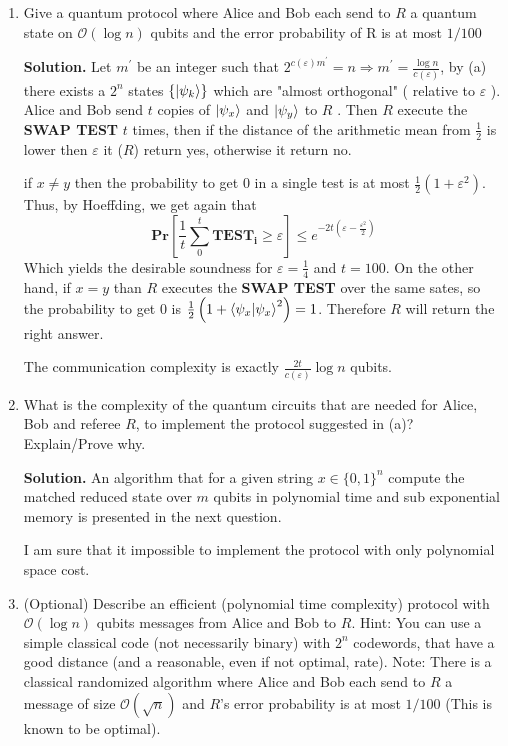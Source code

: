 \documentclass{article}
\newcommand{\onotation}[1]{\(\mathcal{O} \left( {#1}  \right) \)}
\newcommand{\ona}[1]{\onotation{#1}}
\begin{document}
\begin{enumerate}
    \item Give a quantum protocol where Alice and Bob each send to \(R\) a quantum state on \ona{ \log n}  qubits and the error probability of R is at most \( 1/100\) 
    
    
    \textbf{Solution.} Let \(m^\prime\) be an integer such that \( 2^{c(\varepsilon)m^\prime} = n \Rightarrow m^\prime = \frac{\log n}{c(\varepsilon)}\), by (a) there exists a \(2^n\) states \( \{ \ket{\psi_k} \} \) which are "almost orthogonal" ( relative to \(\varepsilon\) ). Alice and Bob send \(t\) copies of \( \ket{\psi_x} \) and \( \ket{\psi_y} \) to \(R\) . Then \(R\) execute the \textbf{SWAP TEST} \(t\) times, then if the distance of the arithmetic mean from \( \frac{1}{2} \) is lower then \(\varepsilon \) it (\(R\)) return yes, otherwise it return no.
    
    if \( x \neq y\) then the probability to get 0 in a single test is at most \( \frac{1}{2} \left( 1+ \varepsilon^2\right) \). Thus, by Hoeffding, we get again that \[ \mathbf{Pr} \left[ \frac{1}{t}\sum_{0}^{t}{ \mathbf{TEST_i} } \ge \varepsilon \right] \le e^{-2t\left( \varepsilon - \frac{\varepsilon^2}{2} \right)} \] Which yields the desirable soundness for \( \varepsilon = \frac{1}{4} \) and \( t = 100 \).   
    On the other hand, if \(x = y\) than \(R\) executes the \textbf{SWAP TEST} over the same sates, so the probability to get 0 is \(\frac{1}{2}\left(1 +  \braket{\psi_x | \psi_x}^2 \right) = 1\). Therefore \(R\) will return the right answer. 
    
    The communication complexity is exactly \( \frac{2t}{c(\varepsilon)}\log n\) qubits.
\item What is the complexity of the quantum circuits that are needed for Alice, Bob and referee \(R\), to implement the protocol suggested in (a)? Explain/Prove why.

\textbf{Solution.} An algorithm that for a given string \( x \in \{0,1\}^n \) compute the matched reduced state over \(m\) qubits in polynomial time and sub exponential memory is presented in the next question.

I am sure that it impossible to implement the protocol with only polynomial space cost.        

\item (Optional) Describe an efficient (polynomial time complexity) protocol with \ona{\log n} qubits messages from Alice and Bob to \(R\). Hint: You can use a simple classical code (not necessarily binary)
with \(2^n\) codewords, that have a good distance (and a reasonable, even if not optimal, rate). Note: There is a classical randomized algorithm where Alice and Bob each send to \(R\) a message of size \ona{\sqrt{n}}  and \(R\)’s error probability is at most \(1/100\) (This is known to be optimal).



\end{enumerate}
\end{document}
